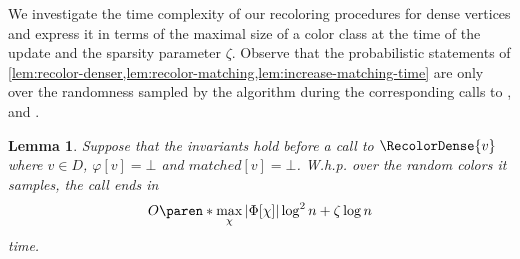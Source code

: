 \documentclass[a4paper,english,11pt]{amsart}
\newtheorem{lemma}{Lemma}[section]
\theoremstyle{definition}
\DeclarePairedDelimiter{\paren}()
\newcommand{\col}{\varphi}
\begin{document}
We investigate the time complexity of our recoloring procedures for dense vertices and express it
in terms of the maximal size of a color class at the time of the update and the sparsity parameter $\zeta$. Observe that the probabilistic statements of \cref{lem:recolor-denser,lem:recolor-matching,lem:increase-matching-time} are only over the randomness sampled by the algorithm during the corresponding calls to \RecolorDense, \RecolorMatching and \AddAntiEdgeMatching.

\begin{lemma}
    \label{lem:recolor-denser}
    Suppose that the invariants hold before a call to $\RecolorDense{v}$ where $v\in D$, $\col[v] = \bot$ and $matched[v] = \bot$.
W.h.p. over the random colors it samples, the call ends in
    \[ O\paren*{ \max_{\chi} |\Phi[\chi]| \log^2 n + \zeta \log n } \]
    time.
\end{lemma}
\end{document}
